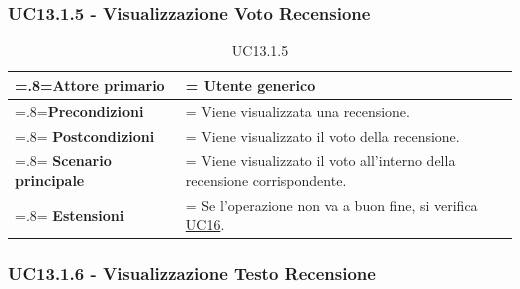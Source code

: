         \subsubsection{UC13.1.5 - Visualizzazione Voto Recensione}
        \label{UC13.1.5}

            \begin{table}[H]
                \centering
                \renewcommand{\arraystretch}{1.8}
                \renewcommand\tabularxcolumn[1]{m{#1}}
                \begin{tabularx}{0.9\textwidth} {
                    >{\hsize=.8\hsize\linewidth=\hsize}X
                    >{\hsize=1.2\hsize\linewidth=\hsize}X}
                    \hline
                    \textbf{Attore primario} & Utente generico \\
                    \hline
                    \textbf{Precondizioni} & Viene visualizzata una recensione. \\
                    \hline
                    \textbf{Postcondizioni} & Viene visualizzato il voto della recensione. \\
                    \hline
                    \textbf{Scenario principale} & Viene visualizzato il voto all'interno della recensione corrispondente. \\
                    \hline
                    \textbf{Estensioni} & Se l'operazione non va a buon fine, si verifica \hyperref[UC16]{UC16}. \\
                    \hline
                \end{tabularx}
                \caption{UC13.1.5}
            \end{table}

        \subsubsection{UC13.1.6 - Visualizzazione Testo Recensione}
        \label{UC13.1.6}

